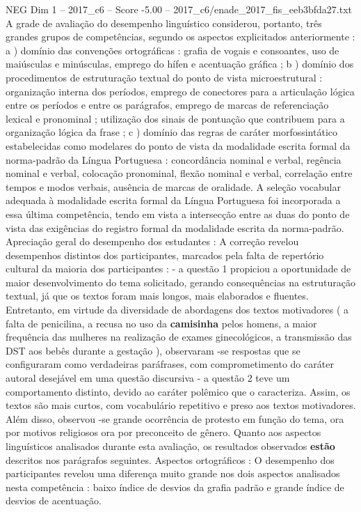\begin{textsample}{NEG Dim 1 – 2017\_c6 – Score -5.00 – 2017\_c6/enade\_2017\_fis\_eeb3bfda27.txt}
A grade de avaliação do desempenho linguístico considerou, portanto, três grandes grupos de competências, segundo os aspectos explicitados anteriormente : a ) domínio das convenções ortográficas : grafia de vogais e consoantes, uso de maiúsculas e minúsculas, emprego do hífen e acentuação gráfica ; b ) domínio dos procedimentos de estruturação textual do ponto de vista microestrutural : organização interna dos períodos, emprego de conectores para a articulação lógica entre os períodos e entre os parágrafos, emprego de marcas de referenciação lexical e pronominal ; utilização dos sinais de pontuação que contribuem para a organização lógica da frase ; c ) domínio das regras de caráter morfossintático estabelecidas como modelares do ponto de vista da modalidade escrita formal da norma-padrão da Língua Portuguesa : concordância nominal e verbal, regência nominal e verbal, colocação pronominal, flexão nominal e verbal, correlação entre tempos e modos verbais, ausência de marcas de oralidade.
A seleção vocabular adequada à modalidade escrita formal da Língua Portuguesa foi incorporada a essa última competência, tendo em vista a intersecção entre as duas do ponto de vista das exigências do registro formal da modalidade escrita da norma-padrão.
Apreciação geral do desempenho dos estudantes : A correção revelou desempenhos distintos dos participantes, marcados pela falta de repertório cultural da maioria dos participantes : - a questão 1 propiciou a oportunidade de maior desenvolvimento do tema solicitado, gerando consequências na estruturação textual, já que os textos foram mais longos, mais elaborados e fluentes.
Entretanto, em virtude da diversidade de abordagens dos textos motivadores ( a falta de penicilina, a recusa no uso da \textbf{camisinha} pelos homens, a maior frequência das mulheres na realização de exames ginecológicos, a transmissão das DST aos bebês durante a gestação ), observaram -se respostas que se configuraram como verdadeiras paráfrases, com comprometimento do caráter autoral desejável em uma questão discursiva - a questão 2 teve um comportamento distinto, devido ao caráter polêmico que o caracteriza.
Assim, os textos são mais curtos, com vocabulário repetitivo e preso aos textos motivadores.
Além disso, observou -se grande ocorrência de protesto em função do tema, ora por motivos religiosos ora por preconceito de gênero.
Quanto aos aspectos linguísticos analisados durante esta avaliação, os resultados observados \textbf{estão} descritos nos parágrafos seguintes.
Aspectos ortográficos : O desempenho dos participantes revelou uma diferença muito grande nos dois aspectos analisados nesta competência : baixo índice de desvios da grafia padrão e grande índice de desvios de acentuação.

\end{textsample}
